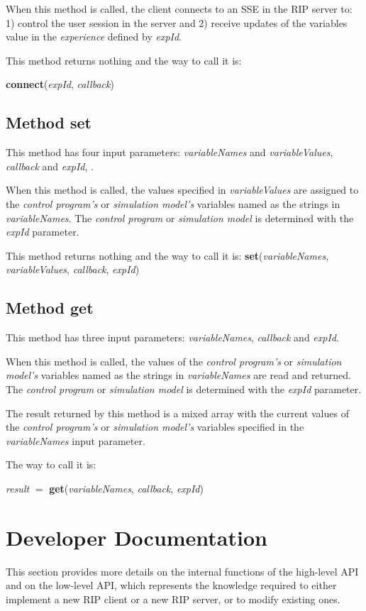 When this method is called, the client connects to an SSE in the RIP server to: 1) control the user session in the server and 2) receive updates of the variables value in the \textit{experience} defined by \textit{expId}.

This method returns nothing and the way to call it is: 

\textbf{connect}(\textit{expId}, \textit{callback})

\subsection{Method set}
This method has four input parameters: \textit{variableNames} and \textit{variableValues}, \textit{callback} and \textit{expId}, .

When this method is called, the values specified in \textit{variableValues} are assigned to the \textit{control program's} or \textit{simulation model's} variables named as the strings in \textit{variableNames}. The \textit{control program} or \textit{simulation model} is determined with the \textit{expId} parameter. 

This method returns nothing and the way to call it is: \textbf{set}(\textit{variableNames}, \textit{variableValues}, \textit{callback}, \textit{expId})

\subsection{Method get}
This method has three input parameters: \textit{variableNames}, \textit{callback} and \textit{expId}.

When this method is called, the values of the \textit{control program's} or \textit{simulation model's} variables named as the strings in \textit{variableNames} are read and returned. The \textit{control program} or \textit{simulation model} is determined with the \textit{expId} parameter.

The result returned by this method is a mixed array with the current values of the \textit{control program's} or \textit{simulation model's} variables specified in the \textit{variableNames} input parameter.

The way to call it is:

\textit{result} $=$ \textbf{get}(\textit{variableNames}, \textit{callback}, \textit{expId})

\section{Developer Documentation}
\label{sec:Developer_Doc}
This section provides more details on the internal functions of the high-level API and on the low-level API, which represents the knowledge required to either implement a new RIP client or a new RIP server, or to modify existing ones.

